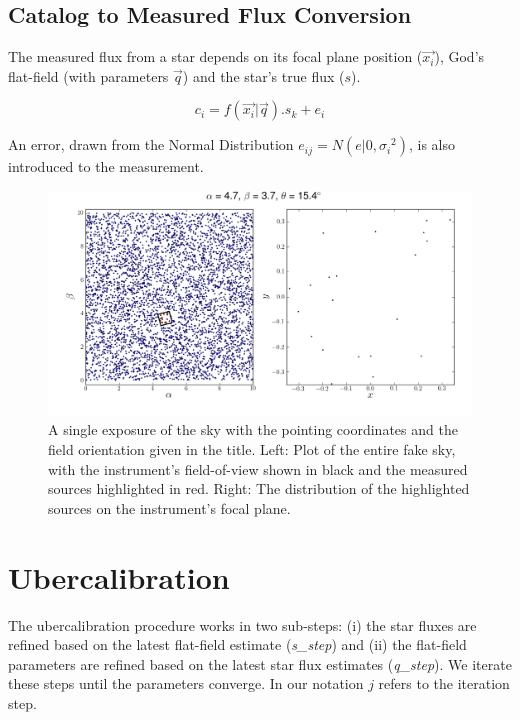 \documentclass[12pt,a4paper,twoside]{article}
\begin{document}
\subsection{Catalog to Measured Flux Conversion}
The measured flux from a star depends on its focal plane position ($\vec{x_i}$), God's flat-field (with parameters $\vec{q}$) and the star's true flux ($s$). 

\begin{equation}
c_i = f(\vec{x_i} | \vec{q}) . s_{k} + e_{i}
\end{equation}

\noindent{}An error, drawn from the Normal Distribution $e_{ij} = N(e|0,{\sigma_i}^2)$, is also introduced to the measurement.

\begin{figure}[ht]
\begin{center}
\includegraphics[width=\textwidth]{camera.png}
\end{center}
\caption{A single exposure of the sky with the pointing coordinates and the field orientation given in the title. Left: Plot of the entire fake sky, with the instrument's field-of-view shown in black and the measured sources highlighted in red. Right: The distribution of the highlighted sources on the instrument's focal plane. \label{fig:camera}}
\end{figure}


\section{Ubercalibration}
The ubercalibration procedure works in two sub-steps: (i) the star fluxes are refined based on the latest flat-field estimate (\textit{s\_step}) and (ii) the flat-field parameters are refined based on the latest star flux estimates (\textit{q\_step}). We iterate these steps until the parameters converge. In our notation $j$ refers to the iteration step. 
\end{document}
